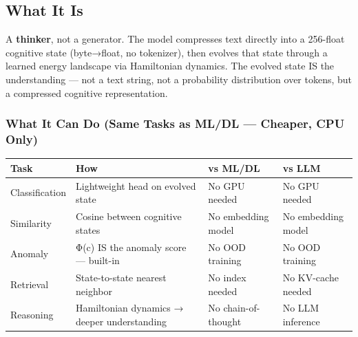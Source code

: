 \documentclass[
  11pt,
  a4paper,
]{article}
\begin{document}
\subsection{What It Is}\label{what-it-is}

A \textbf{thinker}, not a generator. The model compresses text directly
into a 256-float cognitive state (byte→float, no tokenizer), then
evolves that state through a learned energy landscape via Hamiltonian
dynamics. The evolved state IS the understanding --- not a text string,
not a probability distribution over tokens, but a compressed cognitive
representation.

\subsubsection{What It Can Do (Same Tasks as ML/DL --- Cheaper, CPU
Only)}\label{what-it-can-do-same-tasks-as-mldl-cheaper-cpu-only}

\begin{longtable}[]{@{}
  >{\raggedright\arraybackslash}p{}
  >{\raggedright\arraybackslash}p{}
  >{\raggedright\arraybackslash}p{}
  >{\raggedright\arraybackslash}p{}@{}}
\toprule\noalign{}
\begin{minipage}[b]{\linewidth}\raggedright
Task
\end{minipage} & \begin{minipage}[b]{\linewidth}\raggedright
How
\end{minipage} & \begin{minipage}[b]{\linewidth}\raggedright
vs ML/DL
\end{minipage} & \begin{minipage}[b]{\linewidth}\raggedright
vs LLM
\end{minipage} \\
\midrule\noalign{}
\endhead
\bottomrule\noalign{}
\endlastfoot
Classification & Lightweight head on evolved state & No GPU needed & No
GPU needed \\
Similarity & Cosine between cognitive states & No embedding model & No
embedding model \\
Anomaly & Φ(c) IS the anomaly score --- built-in & No OOD training & No
OOD training \\
Retrieval & State-to-state nearest neighbor & No index needed & No
KV-cache needed \\
Reasoning & Hamiltonian dynamics → deeper understanding & No
chain-of-thought & No LLM inference \\
\end{longtable}
\end{document}
